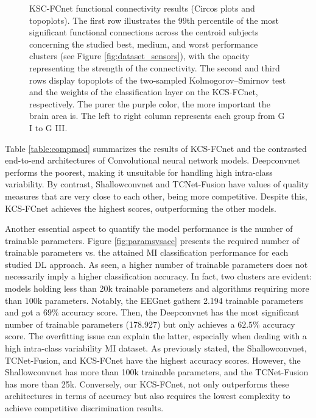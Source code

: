 \begin{figure}
\begin{subfigure}[b]{\linewidth}
    \end{subfigure}
    \caption{KSC-FCnet functional connectivity results (Circos plots and topoplots). The first row illustrates the 99th percentile of the most significant functional connections across the centroid subjects concerning the studied best, medium, and worst performance clusters (see Figure \ref{fig:dataset_sensors}), with the opacity representing the strength of the connectivity. The second and third rows display topoplots of the two-sampled Kolmogorov--Smirnov test and the weights of the classification layer on the KCS-FCnet, respectively. The purer the purple color, the more important the brain area is. The left to right column represents each group from G I to G III.}
    \label{fig:topoplot_graphs}
\end{figure}

Table \ref{table:compmod} summarizes the results of KCS-FCnet and the contrasted end-to-end architectures of Convolutional neural network models. Deepconvnet performs the poorest, making it unsuitable for handling high intra-class variability. By contrast, Shallowconvnet and TCNet-Fusion have values of quality measures that are very close to each other, being more competitive. Despite this, KCS-FCnet achieves the highest scores, outperforming the other models.


Another essential aspect to quantify the model performance is the number of trainable parameters. Figure \ref{fig:paramsvsacc} presents the required number of trainable parameters vs. the attained MI classification performance for each studied DL approach. As seen, a higher number of trainable parameters does not necessarily imply a higher classification accuracy. In fact, two clusters are evident: models holding less than 20k trainable parameters and algorithms requiring more than 100k parameters. Notably, the EEGnet gathers 2.194 trainable parameters and got a $69\%$ accuracy score. Then,  the Deepconvnet has the most significant number of trainable parameters (178.927) but only achieves a $62.5\%$ accuracy score. The overfitting issue can explain the latter, especially when dealing with a high intra-class variability MI dataset. As previously stated, the Shallowconvnet, TCNet-Fusion, and KCS-FCnet have the highest accuracy scores. However, the Shallowconvnet has more than 100k trainable parameters, and the TCNet-Fusion has more than 25k. Conversely, our KCS-FCnet, not only outperforms these architectures in terms of accuracy but also requires the lowest complexity to achieve competitive discrimination results.


